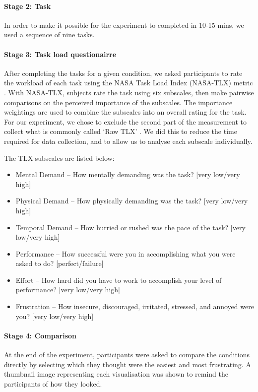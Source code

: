 \paragraph{Stage 2: Task}

In order to make it possible for the experiment to completed in 10-15 mins, we used a sequence of nine tasks.

\paragraph{Stage 3: Task load questionairre}

After completing the tasks for a given condition, we asked participants to rate the workload of each task using the
NASA Task Load Index (NASA-TLX) metric \citep{Hart1988}.  With NASA-TLX, subjects rate the task using six subscales,
then make pairwise comparisons on the perceived importance of the subscales. The importance weightings are used to
combine the subscales into an overall rating for the task. For our experiment, we chose to exclude the second part of
the measurement to collect what is commonly called `Raw TLX' \citep{Hart2006}. We did this to reduce the time required
for data collection, and to allow us to analyse each subscale individually.

The TLX subscales are listed below:

{\singlespacing
\begin{itemize}
  \item Mental Demand -- How mentally demanding was the task? [very low/very high]
  \item Physical Demand -- How physically demanding was the task? [very low/very high]
  \item Temporal Demand -- How hurried or rushed was the pace of the task?  [very low/very high]
  \item Performance -- How successful were you in accomplishing what you were asked to do? [perfect/failure]
  \item Effort -- How hard did you have to work to accomplish your level of performance? [very low/very high]
  \item Frustration -- How insecure, discouraged, irritated, stressed, and annoyed were you? [very low/very high]
\end{itemize}
}

\paragraph{Stage 4: Comparison}
At the end of the experiment, participants were asked to compare the conditions directly by selecting which they
thought were the easiest and most frustrating. A thumbnail image representing each visualisation was shown to remind
the participants of how they looked.

